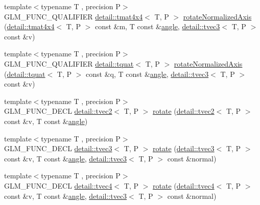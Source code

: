 \begin{DoxyCompactItemize}
\item 
{\footnotesize template$<$typename T , precision P$>$ }\\G\+L\+M\+\_\+\+F\+U\+N\+C\+\_\+\+Q\+U\+A\+L\+I\+F\+I\+ER \hyperlink{structglm_1_1detail_1_1tmat4x4}{detail\+::tmat4x4}$<$ T, P $>$ \hyperlink{group__gtx__rotate__normalized__axis_gac47b4efcecdaf7e892b10ae89135c544}{rotate\+Normalized\+Axis} (\hyperlink{structglm_1_1detail_1_1tmat4x4}{detail\+::tmat4x4}$<$ T, P $>$ const \&m, T const \&\hyperlink{group__gtc__quaternion_ga23a3fc7ada5bbb665ff84c92c6e0542c}{angle}, \hyperlink{structglm_1_1detail_1_1tvec3}{detail\+::tvec3}$<$ T, P $>$ const \&v)
\item 
{\footnotesize template$<$typename T , precision P$>$ }\\G\+L\+M\+\_\+\+F\+U\+N\+C\+\_\+\+Q\+U\+A\+L\+I\+F\+I\+ER \hyperlink{structglm_1_1detail_1_1tquat}{detail\+::tquat}$<$ T, P $>$ \hyperlink{group__gtx__rotate__normalized__axis_ga774f0f09fc99b3a967001cb116aa7f2a}{rotate\+Normalized\+Axis} (\hyperlink{structglm_1_1detail_1_1tquat}{detail\+::tquat}$<$ T, P $>$ const \&q, T const \&\hyperlink{group__gtc__quaternion_ga23a3fc7ada5bbb665ff84c92c6e0542c}{angle}, \hyperlink{structglm_1_1detail_1_1tvec3}{detail\+::tvec3}$<$ T, P $>$ const \&v)
\item 
{\footnotesize template$<$typename T , precision P$>$ }\\G\+L\+M\+\_\+\+F\+U\+N\+C\+\_\+\+D\+E\+CL \hyperlink{structglm_1_1detail_1_1tvec2}{detail\+::tvec2}$<$ T, P $>$ \hyperlink{group__gtx__rotate__vector_ga5520f6dd671807ec62a8f97c00c1b78b}{rotate} (\hyperlink{structglm_1_1detail_1_1tvec2}{detail\+::tvec2}$<$ T, P $>$ const \&v, T const \&\hyperlink{group__gtc__quaternion_ga23a3fc7ada5bbb665ff84c92c6e0542c}{angle})
\item 
{\footnotesize template$<$typename T , precision P$>$ }\\G\+L\+M\+\_\+\+F\+U\+N\+C\+\_\+\+D\+E\+CL \hyperlink{structglm_1_1detail_1_1tvec3}{detail\+::tvec3}$<$ T, P $>$ \hyperlink{group__gtx__rotate__vector_ga4eccdf3769ce3b5d1e4018394290f88c}{rotate} (\hyperlink{structglm_1_1detail_1_1tvec3}{detail\+::tvec3}$<$ T, P $>$ const \&v, T const \&\hyperlink{group__gtc__quaternion_ga23a3fc7ada5bbb665ff84c92c6e0542c}{angle}, \hyperlink{structglm_1_1detail_1_1tvec3}{detail\+::tvec3}$<$ T, P $>$ const \&normal)
\item 
{\footnotesize template$<$typename T , precision P$>$ }\\G\+L\+M\+\_\+\+F\+U\+N\+C\+\_\+\+D\+E\+CL \hyperlink{structglm_1_1detail_1_1tvec4}{detail\+::tvec4}$<$ T, P $>$ \hyperlink{group__gtx__rotate__vector_gac4abb6be47bd14303d6eded41f2f65f1}{rotate} (\hyperlink{structglm_1_1detail_1_1tvec4}{detail\+::tvec4}$<$ T, P $>$ const \&v, T const \&\hyperlink{group__gtc__quaternion_ga23a3fc7ada5bbb665ff84c92c6e0542c}{angle}, \hyperlink{structglm_1_1detail_1_1tvec3}{detail\+::tvec3}$<$ T, P $>$ const \&normal)

\end{DoxyCompactItemize}
